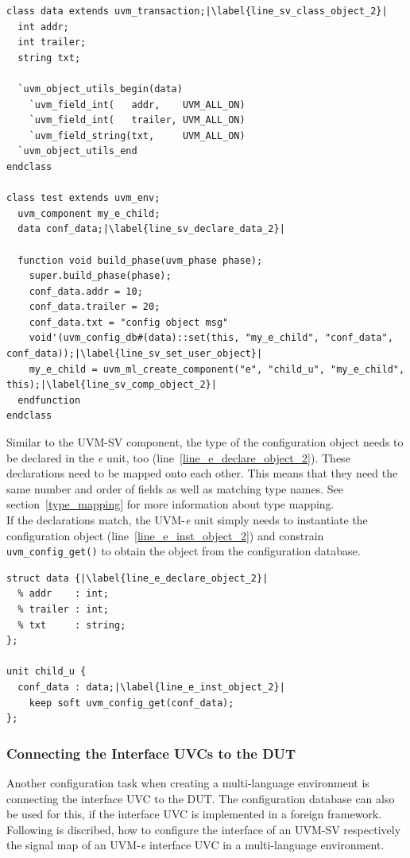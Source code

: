 \lstset{language=SystemVerilog, numbers = left, escapechar=|, breaklines=true}
\begin{lstlisting}[frame=htrbl, caption={SystemVerilog: register an object in configuration database},
label={lst:SV_set_object}]
class data extends uvm_transaction;|\label{line_sv_class_object_2}|
  int addr;
  int trailer;
  string txt;
  
  `uvm_object_utils_begin(data)
    `uvm_field_int(   addr,    UVM_ALL_ON)
    `uvm_field_int(   trailer, UVM_ALL_ON)
    `uvm_field_string(txt,     UVM_ALL_ON)
  `uvm_object_utils_end
endclass

class test extends uvm_env;
  uvm_component my_e_child; 
  data conf_data;|\label{line_sv_declare_data_2}|
  
  function void build_phase(uvm_phase phase);
    super.build_phase(phase);
    conf_data.addr = 10;
    conf_data.trailer = 20;
    conf_data.txt = "config object msg"
    void'(uvm_config_db#(data)::set(this, "my_e_child", "conf_data", conf_data));|\label{line_sv_set_user_object}|
    my_e_child = uvm_ml_create_component("e", "child_u", "my_e_child", this);|\label{line_sv_comp_object_2}|
  endfunction
endclass
\end{lstlisting}

Similar to the UVM-SV component, the type of the configuration object needs to be declared in the
\textit{e} unit, too (line~\ref{line_e_declare_object_2}). These declarations need to be mapped onto each other. This
means that they need the same number and order of fields as well as matching type names. See section~\ref{type_mapping}
for more information about type mapping.\\
If the declarations match, the UVM-\textit{e} unit simply needs to instantiate the configuration object
(line~\ref{line_e_inst_object_2}) and constrain \lstinline$uvm_config_get()$ to obtain the object from the
configuration database.

\lstset{language=e, numbers = left, escapechar=|, breaklines=true}
\begin{lstlisting}[frame=htrbl, caption={e: getting an object from configuration database}, label={lst:e_get_object}]
struct data {|\label{line_e_declare_object_2}|
  % addr    : int;
  % trailer : int;
  % txt     : string;
};

unit child_u {
  conf_data : data;|\label{line_e_inst_object_2}|
    keep soft uvm_config_get(conf_data);
};
\end{lstlisting}
\subsubsection{Connecting the Interface UVCs to the DUT}
Another configuration task when creating a multi-language environment is connecting the interface UVC to the DUT. The configuration database can also be used for this, if the interface UVC is implemented in a foreign framework. Following is discribed, how to configure the interface of an UVM-SV respectively the signal map of an UVM-\textit{e} interface UVC in a multi-language environment.
